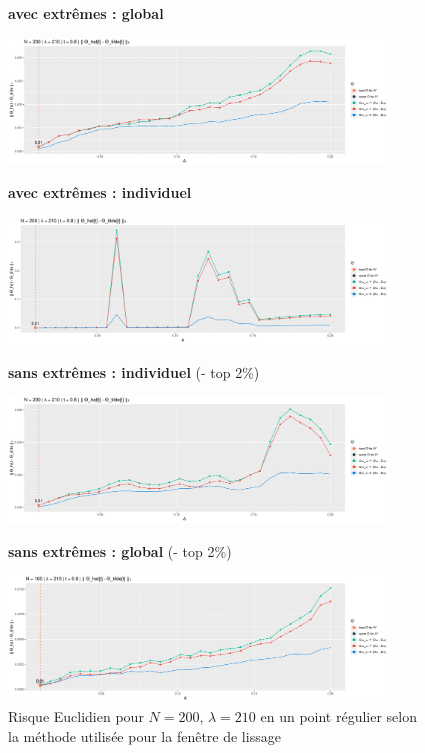 \begin{figure}[H]
	\centering

	\textbf{avec extrêmes : global}

\includegraphics[width=0.9\textwidth]{Images/indiv_glob_img/compare/210_regular/all_glob.jpg}

	\textbf{avec extrêmes : individuel}

\includegraphics[width=0.9\textwidth]{Images/indiv_glob_img/compare/210_regular/all.jpg}

	\textbf{sans extrêmes : individuel} (- top 2\%)

\includegraphics[width=0.9\textwidth]{Images/indiv_glob_img/compare/210_regular/no_xtrm.jpg}

	\textbf{sans extrêmes : global} (- top 2\%)

\includegraphics[width=0.9\textwidth]{Images/indiv_glob_img/compare/210_regular/no_xtrm_glob.jpg}
	\caption{Risque Euclidien pour $N=200$, $\lambda=210$ en un point régulier selon la méthode utilisée pour la fenêtre de lissage}
	\label{fig:compare_xtrm_2}
\end{figure}
